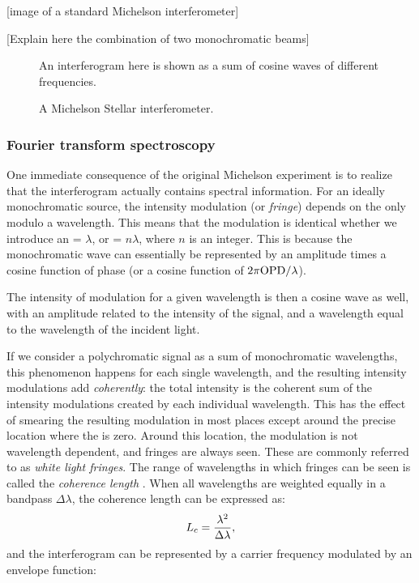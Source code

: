 [image of a standard Michelson interferometer]

[Explain here the combination of two monochromatic beams]


\begin{figure}[!ht]
	\centering
	
	\caption[Simple interferogram]{An interferogram here is shown as a sum of cosine waves of different frequencies.}
	\label{fig:interferogram}
    \end{figure}
\begin{figure}[!ht]
	\centering
	
	\caption[Michelson interferometer]{A Michelson Stellar interferometer.}
	\label{fig:interferometer}
    \end{figure}


\subsubsection{Fourier transform spectroscopy}

One immediate consequence of the original Michelson experiment is to realize that the interferogram actually contains spectral information. For an ideally monochromatic source, the intensity modulation (or \textit{fringe}) depends on the \OPD only modulo a wavelength. This means that the modulation is identical whether we introduce an \OPD = $\lambda$, or \OPD = $n\lambda$, where $n$ is an integer. This is because the monochromatic wave can essentially be represented by an amplitude times a cosine function of phase (or a cosine function of $2\pi\textrm{OPD} /\lambda$).

The intensity of modulation for a given wavelength is then a cosine wave as well, with an amplitude related to the intensity of the signal, and a wavelength equal to the wavelength of the incident light.

If we consider a polychromatic signal as a sum of monochromatic wavelengths, this phenomenon happens for each single wavelength, and the resulting intensity modulations add \textit{coherently}: the total intensity is the coherent sum of the intensity modulations created by each individual wavelength. This has the effect of smearing the resulting modulation in most places except around the precise location where the \OPD is zero. Around this location, the modulation is not wavelength dependent, and fringes are always seen. These are commonly referred to as \textit{white light fringes}. The range of wavelengths in which fringes can be seen is called the \textit{coherence length} \Lc. When all wavelengths are weighted equally in a bandpass $\Delta\lambda$, the coherence length can be expressed as:
\begin{equation}
L_c = \frac{\lambda^2}{\Delta\lambda},
\end{equation}
and the interferogram can be represented by a carrier frequency modulated by an envelope function:

